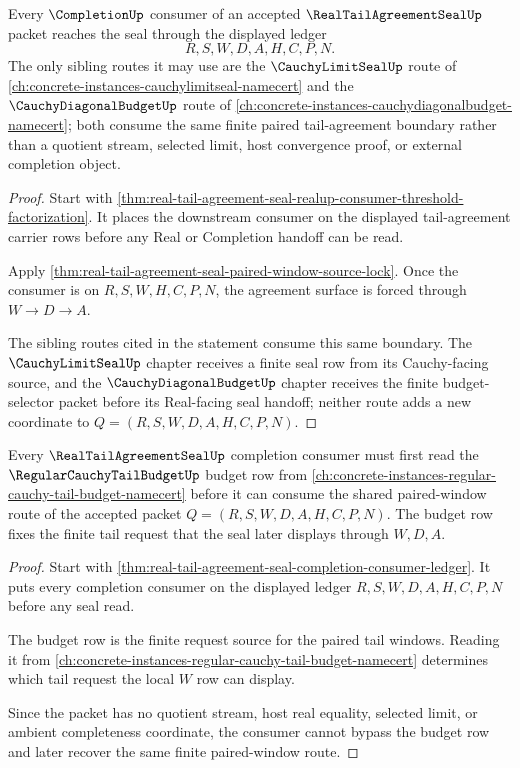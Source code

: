 \begin{theorem}
\label{thm:real-tail-agreement-seal-completion-consumer-ledger}
Every $\CompletionUp$ consumer of an accepted $\RealTailAgreementSealUp$ packet reaches the seal through the displayed ledger
$$
R,S,W,D,A,H,C,P,N.
$$
The only sibling routes it may use are the $\CauchyLimitSealUp$ route of \autoref{ch:concrete-instances-cauchylimitseal-namecert} and the $\CauchyDiagonalBudgetUp$ route of \autoref{ch:concrete-instances-cauchydiagonalbudget-namecert}; both consume the same finite paired tail-agreement boundary rather than a quotient stream, selected limit, host convergence proof, or external completion object.
\end{theorem}
\begin{proof}
Start with \autoref{thm:real-tail-agreement-seal-realup-consumer-threshold-factorization}. It places the downstream consumer on the displayed tail-agreement carrier rows before any Real or Completion handoff can be read.

Apply \autoref{thm:real-tail-agreement-seal-paired-window-source-lock}. Once the consumer is on $R,S,W,H,C,P,N$, the agreement surface is forced through $W \to D \to A$.

The sibling routes cited in the statement consume this same boundary. The $\CauchyLimitSealUp$ chapter receives a finite seal row from its Cauchy-facing source, and the $\CauchyDiagonalBudgetUp$ chapter receives the finite budget-selector packet before its Real-facing seal handoff; neither route adds a new coordinate to $Q=(R,S,W,D,A,H,C,P,N)$.
\end{proof}

\begin{theorem}
\label{thm:real-tail-agreement-seal-budget-window-coherence}
Every $\RealTailAgreementSealUp$ completion consumer must first read the $\RegularCauchyTailBudgetUp$ budget row from \autoref{ch:concrete-instances-regular-cauchy-tail-budget-namecert} before it can consume the shared paired-window route of the accepted packet $Q=(R,S,W,D,A,H,C,P,N)$. The budget row fixes the finite tail request that the seal later displays through $W,D,A$.
\end{theorem}
\begin{proof}
Start with \autoref{thm:real-tail-agreement-seal-completion-consumer-ledger}. It puts every completion consumer on the displayed ledger $R,S,W,D,A,H,C,P,N$ before any seal read.

The budget row is the finite request source for the paired tail windows. Reading it from \autoref{ch:concrete-instances-regular-cauchy-tail-budget-namecert} determines which tail request the local $W$ row can display.

Since the packet has no quotient stream, host real equality, selected limit, or ambient completeness coordinate, the consumer cannot bypass the budget row and later recover the same finite paired-window route.
\end{proof}

